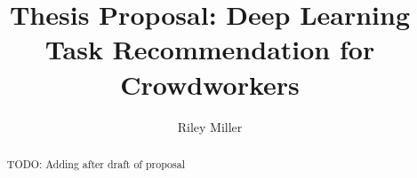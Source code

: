 \documentclass[letterpaper,12pt]{article}
\title{Thesis Proposal: Deep Learning Task Recommendation for Crowdworkers}
\author{Riley Miller}
\begin{document}
\nocite{*}


\frontmatter


\maketitle
\newpage


\makecopyright{\the\year}
\newpage


\makesubmittal
\newpage


\begin{abstract}

TODO: Adding after draft of proposal
\end{abstract}

\newpage


\tableofcontents
\newpage






\end{document}
